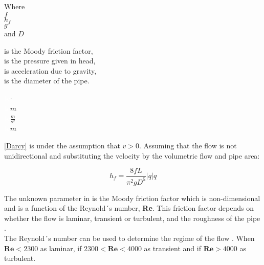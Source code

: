  \begin{minipage}[t]{0.20\textwidth}
Where\\
\hspace*{8mm} $f$ \\
\hspace*{8mm} $h_f$ \\
\hspace*{8mm} $g$ \\
and \hspace*{0.7mm} $D$ 
\end{minipage}
\begin{minipage}[t]{0.68\textwidth}
\vspace*{2mm}
is the Moody friction factor,\\ 
is the pressure given in head,\\ 
is acceleration due to gravity,\\
is the diameter of the pipe.
\end{minipage}
\begin{minipage}[t]{0.10\textwidth}
\vspace*{2mm}
\textcolor{White}{te}$\unit{\cdot}$\\
\textcolor{White}{te}$\unit{m}$\\
\textcolor{White}{te}$\unit{\frac{m}{s^2}}$\\
\textcolor{White}{te}$\unit{m}$
\end{minipage}

\eqref{Darcy} is under the assumption that $v>0$. %
 Assuming that the flow is not unidirectional and substituting the velocity by the volumetric flow and pipe area:

\begin{equation}
  h_f = \frac{8fL}{\pi^{2}gD^5} |q| q
  \label{DarcyWeisbach}
\end{equation} 
 
 The unknown parameter in  is the Moody friction factor 
 which is non-dimensional and is a function of the Reynold´s number, \textbf{Re}. This friction factor depends on whether the flow is laminar, transient or turbulent, and the roughness of the pipe \cite{Intro_Fluid}. \\
 
 
The Reynold´s number can be used to determine the regime of the flow \cite{Intro_Fluid}. When $\bm{Re}<2300$ as laminar, if $2300<\bm{Re}<4000$ as transient and if
$\bm{Re}>4000$ as turbulent. 

